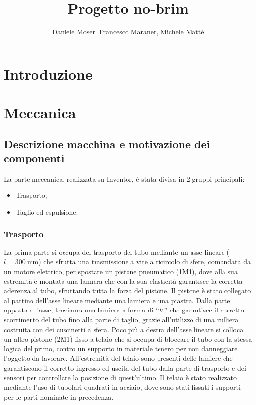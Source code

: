 \documentclass{report}
\title{Progetto no-brim}
\author{Daniele Moser, Francesco Maraner, Michele Mattè}
\begin{document}
\maketitle
\tableofcontents

\chapter{Introduzione}

\chapter{Meccanica}

\section{Descrizione macchina e motivazione dei componenti}
La parte meccanica, realizzata su Inventor, è stata divisa in 2 gruppi principali:
\begin{itemize}
\item Trasporto;
\item Taglio ed espulsione.
\end{itemize}

\subsection{Trasporto}
La prima parte si occupa del trasporto del tubo mediante un asse lineare ($l=\SI{300}{\mm}$) che sfrutta una trasmissione a vite a ricircolo di sfere, comandata da un motore elettrico, per spostare un pistone pneumatico (1M1), dove alla sua estremità è montata una lamiera che con la sua elasticità garantisce la corretta aderenza al tubo, sfruttando tutta la forza del pistone. Il pistone è stato collegato al pattino dell’asse lineare mediante una lamiera e una piastra. Dalla parte opposta all’asse, troviamo una lamiera a forma di “V” che garantisce il corretto scorrimento del tubo fino alla parte di taglio, grazie all’utilizzo di una rulliera costruita con dei cuscinetti a sfera.
Poco più a destra dell’asse lineare si colloca un altro pistone (2M1) fisso a telaio che si occupa di bloccare il tubo con la stessa logica del primo, contro un supporto in materiale tenero per non danneggiare l’oggetto da lavorare.
All’estremità del telaio sono presenti delle lamiere che garantiscono il corretto ingresso ed uscita del tubo dalla parte di trasporto e dei sensori per controllare la posizione di quest’ultimo. Il telaio è stato realizzato mediante l’uso di tubolari quadrati in acciaio, dove sono stati fissati i supporti per le parti nominate in precedenza.
\end{document}
